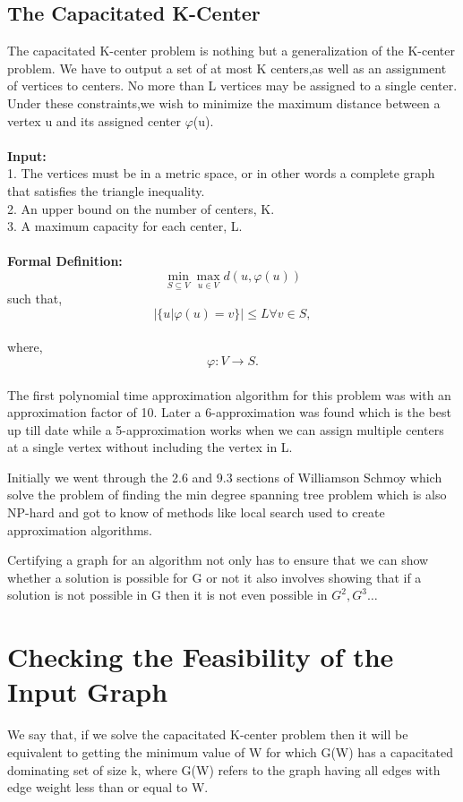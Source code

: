 \documentclass[12pt,a4paper,onecolumn]{article}
\begin{document}
\subsection{The Capacitated K-Center}
The capacitated K-center problem is nothing but a generalization of the K-center problem. We have to
output a set of at most K centers,as well as an assignment of vertices to centers. No more than L vertices may be assigned to a single center. Under these constraints,we
wish to minimize the maximum distance between a vertex u and its assigned center
$\varphi$(u). \\\\
\textbf{Input:}\\1. The vertices must be in a metric space, or in other words a complete graph that satisfies the triangle inequality.\\2. An
upper bound on the number of centers, K.\\3. A maximum capacity for each center, L.\\\\
\textbf{Formal Definition:}\\
$$ \min_{S \subseteq V}\max_{u \in V}d(u,\varphi(u)) $$such that,   $$|\{u|\varphi(u) = v\}|\leq L \forall v \in S,$$\\where,   $$\varphi : V \rightarrow S.$$\\
The first polynomial time approximation
algorithm for this problem was with an approximation factor of 10. Later a 6-approximation was found which is the best up till date while a 5-approximation works when we can assign multiple centers at a single vertex without including the vertex in L.

Initially we went through the 2.6 and 9.3 sections of Williamson Schmoy which solve the problem of finding the min degree spanning tree problem which is also NP-hard and got to know of methods like local search used to create approximation algorithms.

Certifying a graph for an algorithm not only has to ensure that we can show whether a solution is possible for G or not it also involves showing that if a solution is not possible in G then it is not even possible in $G^2,G^3\ldots$
\section{Checking the Feasibility of the Input Graph}
We say that, if we solve the capacitated K-center problem then it will be equivalent to getting the minimum value of W for which G(W) has a capacitated dominating set of size k, where G(W) refers to the graph having all edges with edge weight less than or equal to W.
\end{document}
